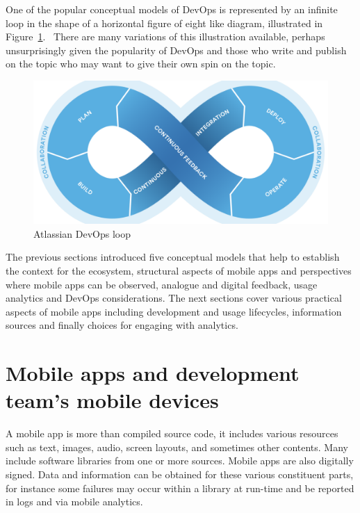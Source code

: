 One of the popular conceptual models of DevOps is represented by an infinite loop in the shape of a horizontal figure of eight like diagram, illustrated in Figure~\ref{fig:atlassian-state-of-devops-report-2016-devopsloop}.~ There are many variations of this illustration available, perhaps unsurprisingly given the popularity of DevOps and those who write and publish on the topic who may want to give their own spin on the topic.

\begin{figure}
    \includegraphics[width=0.8\linewidth]{images/atlassian/atlassian-state-of-devops-report-2016-devopsloop.pdf}
    \caption{Atlassian DevOps loop}
    \label{fig:atlassian-state-of-devops-report-2016-devopsloop}
\end{figure}


The previous sections introduced five conceptual models that help to establish the context for the ecosystem, structural aspects of mobile apps and perspectives where mobile apps can be observed, analogue and digital feedback, usage analytics and DevOps considerations. The next sections cover various practical aspects of mobile apps including development and usage lifecycles, information sources and finally choices for engaging with analytics.


\section{Mobile apps and development team's mobile devices}
A mobile app is more than compiled source code, it includes various resources such as text, images, audio, screen layouts, and sometimes other contents. Many include software libraries from one or more sources. Mobile apps are also digitally signed. Data and information can be obtained for these various constituent parts, for instance some failures may occur within a library at run-time and be reported in logs and via mobile analytics.

